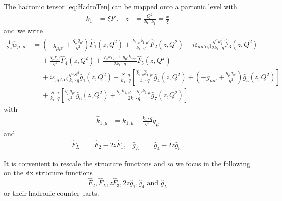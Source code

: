 The hadronic tensor \ref{eq:HadroTen} can be mapped onto a partonic level with
\begin{align}
k_1 &= \xi P', &z &= \frac{Q^2}{2q\cdot k_1} = \frac {x}{\xi}
\end{align}
and we write
\begin{align}
\frac 1 {2z} \hat w_{\mu,\mu'} &= (-g_{\mu\mu'} + \frac{q_\mu q_{\mu'}}{q^2}) \hat F_1(z,Q^2) + \frac{\hat k_{1,\mu} \hat k_{1,\mu'}}{k_1\cdot q} \hat F_2(z,Q^2) - i\varepsilon_{\mu\mu'\alpha\beta} \frac{q^\alpha k_1^\beta}{2k_1\cdot q} \hat F_3(z,Q^2) \nonumber\\
 &\hspace{15pt} + \frac{q_\mu q_{\mu'}}{q^2} \hat F_4(z,Q^2) + \frac{q_\mu k_{1,\mu'} + q_{\mu'}k_{1,\mu}}{2k_1\cdot q} \hat F_5(z,Q^2)  \nonumber\\
 &\hspace{15pt} + i\varepsilon_{\mu\mu'\alpha\beta} \frac{q^\alpha S^\beta}{k_1\cdot q} \hat g_1(z,Q^2) + \frac{S\cdot q}{k_1\cdot q}\left[\frac{\hat k_{1,\mu} \hat k_{1,\mu'}}{k_1\cdot q}\hat g_4(z,Q^2) + (-g_{\mu\mu'} + \frac{q_\mu q_{\mu'}}{q^2}) \hat g_5(z,Q^2)\right] \nonumber\\
 &\hspace{15pt} + \frac{S\cdot q}{k_1\cdot q}\left[\frac{q_\mu q_{\mu'}}{q^2} \hat g_6(z,Q^2) + \frac{q_\mu k_{1,\mu'} + q_{\mu'}k_{1,\mu}}{2k_1\cdot q} \hat g_7(z,Q^2)  \right]
\label{eq:PartonTen}
\end{align}
with
\begin{align}
\hat k_{1,\mu} &= k_{1,\mu} - \frac{k_1\cdot q}{q^2}q_\mu
\end{align}
and
\begin{align}
\hat F_L &= \hat F_2 - 2z\hat F_1, &\hat g_L &= \hat g_4 - 2z\hat g_5\,.
\end{align}

It is convenient to rescale the structure functions and so we focus in the following on the six structure functions
\begin{equation}
\hat F_2, \hat F_L, z\hat F_3, 2z\hat g_1, \hat g_4 \text{ and } \hat g_L
\end{equation}
or their hadronic counter parts.

